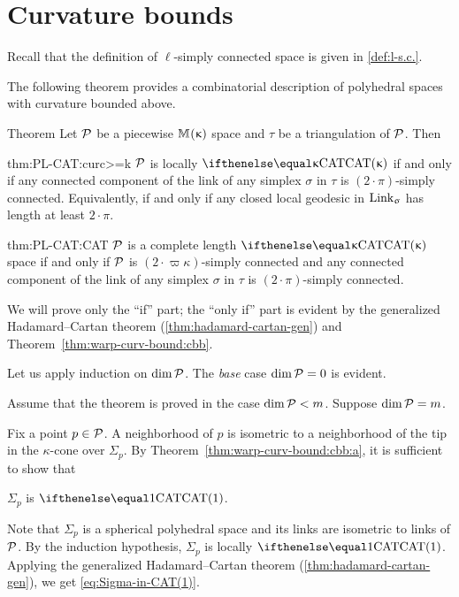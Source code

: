 \section{Curvature bounds}


Recall that the definition of $\ell$-simply connected space is 
given in \ref{def:l-s.c.}.

The following theorem provides a combinatorial description of polyhedral spaces with curvature bounded above.


\begin{thm}{Theorem}\label{thm:PL-CAT}
Let $\mathcal{P}$ be a piecewise
$\mathbb{M}_{{}}^{}({\upkappa})$ space and $\tau$ be a triangulation of $\mathcal{P}$. Then 

\begin{subthm}{thm:PL-CAT:curc>=k}
$\mathcal{P}$  is locally $\CAT\kappa$
if and only if any connected component of the link of any simplex $\sigma$ in $\tau$
is $(2\cdot\pi)$-simply connected.
Equivalently, if and only if any closed local geodesic in $\mathop{\rm Link}\nolimits_\upsigma$ has length at least $2\cdot\pi$.
\end{subthm}

\begin{subthm}{thm:PL-CAT:CAT}
$\mathcal{P}$ is a complete length $\CAT\kappa$ space
if and only if $\mathcal{P}$ is $(2\cdot\varpi\kappa)$-simply connected and any connected component of the link of any simplex $\sigma$ in $\tau$
is $(2\cdot\pi)$-simply connected.
\end{subthm}

\end{thm}


We will prove only the ``if'' part;
the ``only if'' part is evident by the generalized Hadamard--Cartan theorem (\ref{thm:hadamard-cartan-gen}) and Theorem~\ref{thm:warp-curv-bound:cbb}.

Let us apply induction on $\mathop{\rm dim}\nolimits\mathcal{P}$.
The  {}\emph{base}  case $\mathop{\rm dim}\nolimits\mathcal{P}=0$ is evident.

Assume that the theorem is proved in the case $\mathop{\rm dim}\nolimits\mathcal{P}<m$. Suppose  $\mathop{\rm dim}\nolimits\mathcal{P}=m$.

Fix a point $p\in\spc{P}$.
A neighborhood of $p$ 
is isometric to a neighborhood of the tip in the $\kappa$-cone over 
 $\Sigma_p$.
By Theorem~\ref{thm:warp-curv-bound:cbb:a}, 
it is sufficient to show that 
\begin{clm}{}\label{eq:Sigma-in-CAT(1)}
 $\Sigma_p$ is $\CAT1$.
\end{clm}

Note that $\Sigma_p$ is a spherical polyhedral space 
and its  links are isometric to  links of $\mathcal{P}$. 
By the  induction hypothesis, $\Sigma_p$ is locally $\CAT1$.
Applying the generalized Hadamard--Cartan theorem (\ref{thm:hadamard-cartan-gen}),
we get \ref{eq:Sigma-in-CAT(1)}.

